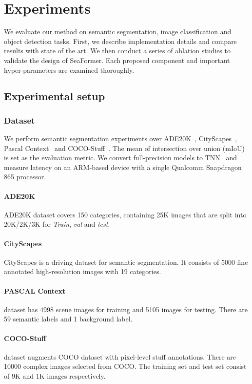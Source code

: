 

\section{Experiments}
\label{Exp}
We evaluate our method on semantic segmentation, image classification and object detection tasks.
First, we describe implementation details and compare results with state of the art.
We then conduct a series of ablation studies to validate the design of SeaFormer.
Each proposed component and important hyper-parameters are examined thoroughly.

\subsection{Experimental setup}
\label{sec:experimental_setup}
\subsubsection{Dataset} We perform semantic segmentation experiments over ADE20K~\cite{zhou2017scene}, CityScapes~\cite{cordts2016cityscapes}, Pascal Context~\cite{mottaghi2014role} and COCO-Stuff~\cite{caesar2018coco}.
The mean of intersection over union (mIoU) is set as the evaluation metric. 
We convert full-precision models to TNN~\cite{contributors2020tnn} and measure latency on an ARM-based device with a single Qualcomm Snapdragon 865 processor.

\paragraph{ADE20K} ADE20K dataset covers 150 categories, containing 25K images that are split into 20K/2K/3K for \textit{Train}, \textit{val} and \textit{test}.

\paragraph{CityScapes} CityScapes is a driving dataset for semantic segmentation. It consists of 5000 fine annotated high-resolution images with 19 categories.

\paragraph{PASCAL Context} dataset has 4998 scene images for training and 5105 images for testing. There are 59 semantic labels and 1 background label.

\paragraph{COCO-Stuff} dataset augments COCO dataset with pixel-level stuff annotations. There are 10000 complex images selected from COCO. The training set and test set consist of 9K and 1K images respectively.


